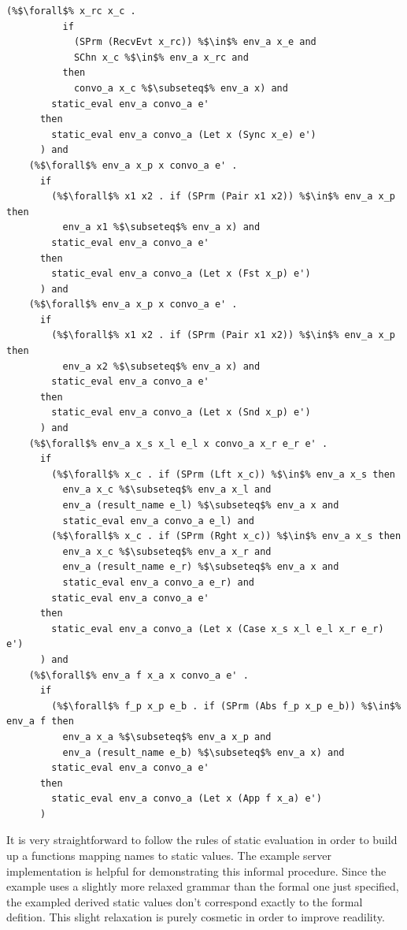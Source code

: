 \documentclass{article}
\begin{document}
\begin{lstlisting}[language=logic, escapechar=\%]
        (%$\forall$% x_rc x_c . 
          if
            (SPrm (RecvEvt x_rc)) %$\in$% env_a x_e and 
            SChn x_c %$\in$% env_a x_rc and 
          then
            convo_a x_c %$\subseteq$% env_a x) and
        static_eval env_a convo_a e'
      then
        static_eval env_a convo_a (Let x (Sync x_e) e')
      ) and
    (%$\forall$% env_a x_p x convo_a e' . 
      if
        (%$\forall$% x1 x2 . if (SPrm (Pair x1 x2)) %$\in$% env_a x_p then
          env_a x1 %$\subseteq$% env_a x) and
        static_eval env_a convo_a e'
      then
        static_eval env_a convo_a (Let x (Fst x_p) e')
      ) and
    (%$\forall$% env_a x_p x convo_a e' . 
      if
        (%$\forall$% x1 x2 . if (SPrm (Pair x1 x2)) %$\in$% env_a x_p then
          env_a x2 %$\subseteq$% env_a x) and
        static_eval env_a convo_a e'
      then
        static_eval env_a convo_a (Let x (Snd x_p) e')
      ) and
    (%$\forall$% env_a x_s x_l e_l x convo_a x_r e_r e' . 
      if
        (%$\forall$% x_c . if (SPrm (Lft x_c)) %$\in$% env_a x_s then 
          env_a x_c %$\subseteq$% env_a x_l and
          env_a (result_name e_l) %$\subseteq$% env_a x and
          static_eval env_a convo_a e_l) and
        (%$\forall$% x_c . if (SPrm (Rght x_c)) %$\in$% env_a x_s then 
          env_a x_c %$\subseteq$% env_a x_r and
          env_a (result_name e_r) %$\subseteq$% env_a x and
          static_eval env_a convo_a e_r) and
        static_eval env_a convo_a e'
      then
        static_eval env_a convo_a (Let x (Case x_s x_l e_l x_r e_r) e')
      ) and
    (%$\forall$% env_a f x_a x convo_a e' . 
      if
        (%$\forall$% f_p x_p e_b . if (SPrm (Abs f_p x_p e_b)) %$\in$% env_a f then 
          env_a x_a %$\subseteq$% env_a x_p and 
          env_a (result_name e_b) %$\subseteq$% env_a x) and
        static_eval env_a convo_a e'
      then
        static_eval env_a convo_a (Let x (App f x_a) e')
      )
  \end{lstlisting}


It is very straightforward to follow the rules of static evaluation in order to build up
a functions mapping names to static values. The example server implementation is helpful for
demonstrating this informal procedure.  Since the example uses a slightly more relaxed grammar
than the formal one just specified, the exampled derived static values don't
correspond exactly to the formal defition.  This slight relaxation is purely cosmetic in order
to improve readility.

\begin{lstlisting}[language=logic, escapechar=\%]
  \end{lstlisting}
\end{document}
